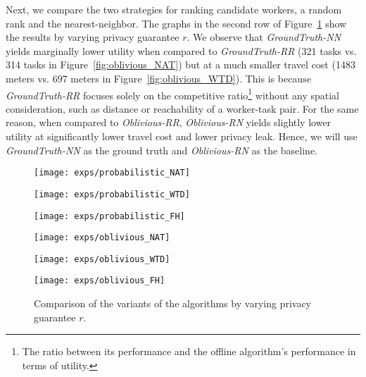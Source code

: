 \documentclass{USC-Thesis}
\numberwithin{equation}{chapter}
\begin{document}
Next, we compare the two strategies for ranking candidate workers, a random rank and the nearest-neighbor. The graphs in the second row of Figure~\ref{fig:variants} show the results by varying privacy guarantee $r$.
We observe that \emph{GroundTruth-NN} yields marginally lower utility when compared to \emph{GroundTruth-RR} (321 tasks vs. 314 tasks in Figure~\ref{fig:oblivious_NAT}) but at a much smaller travel cost (1483 meters vs. 697 meters in Figure~\ref{fig:oblivious_WTD}). This is because \emph{GroundTruth-RR} focuses solely on the competitive ratio\footnote{The ratio between its performance and the offline algorithm's performance in terms of utility.} without any spatial consideration, such as distance or reachability of a worker-task pair. For the same reason, when compared to \emph{Oblivious-RR}, \emph{Oblivious-RN} yields slightly lower utility at significantly lower travel cost and lower privacy leak. Hence, we will use \emph{GroundTruth-NN} as the ground truth and \emph{Oblivious-RN} as the baseline.

\begin{figure}[!ht]
	\begin{minipage}[b]{0.32\linewidth}
		\centering
		\texttt{[image: exps/probabilistic\_NAT]}
		\label{fig:probabilistic_NAT}
	\end{minipage}
	\begin{minipage}[b]{0.32\linewidth}
		\centering
		\texttt{[image: exps/probabilistic\_WTD]}
		\label{fig:probabilistic_WTD}
	\end{minipage}
	\begin{minipage}[b]{0.32\linewidth}
		\centering
		\texttt{[image: exps/probabilistic\_FH]}
		\label{fig:probabilistic_FH}
	\end{minipage}
	\begin{minipage}[b]{0.32\linewidth}
		\centering
		\texttt{[image: exps/oblivious\_NAT]}
		\label{fig:oblivious_NAT}
	\end{minipage}
	\begin{minipage}[b]{0.32\linewidth}
		\centering
		\texttt{[image: exps/oblivious\_WTD]}
		\label{fig:oblivious_WTD}
	\end{minipage}
	\begin{minipage}[b]{0.32\linewidth}
	\centering
		\texttt{[image: exps/oblivious\_FH]}
		\label{fig:oblivious_FH}
	\end{minipage}
	\caption{Comparison of the variants of the algorithms by varying privacy guarantee $r$.}
\label{fig:variants}
\end{figure}
\end{document}
